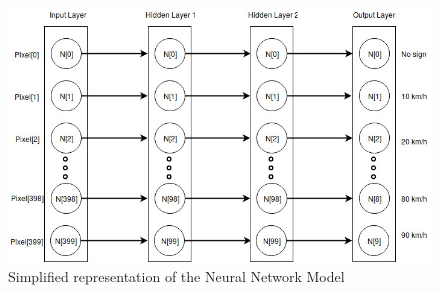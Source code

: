 \begin{figure}[H]
	\centering
	\includegraphics[width=0.9\linewidth]{images/neuralnetmodel.jpg}
	\caption{Simplified representation of the Neural Network Model }\label{fig:neuralnetmodel}    
\end{figure}
